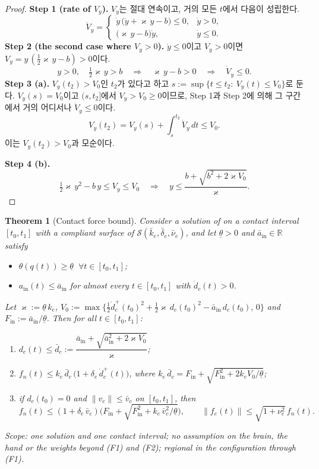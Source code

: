 \documentclass[11pt]{article}\usepackage[margin=1in]{geometry}\usepackage{amsmath,amssymb,amsthm,mathtools}\usepackage{graphicx}\graphicspath{{figures/}{../figures/}{figs/}{./}}\usepackage{enumitem}\usepackage{hyperref}\usepackage{cleveref}\usepackage{tikz}\usetikzlibrary{arrows.meta,positioning,calc,shapes.geometric}\usepackage{float}\usepackage{rotating}\usepackage[most]{tcolorbox}\usepackage{kotex}\usepackage{booktabs}\usepackage{longtable}\emergencystretch=1.6em\tolerance=2000 \crefname{assumption}{Assumption}{Assumptions}\Crefname{assumption}{Assumption}{Assumptions}\crefname{definition}{Definition}{Definitions}\Crefname{definition}{Definition}{Definitions}\crefname{proposition}{Proposition}{Propositions}\Crefname{proposition}{Proposition}{Propositions}\crefname{fact}{Fact}{Facts}\Crefname{fact}{Fact}{Facts} \newtheorem{assumption}{Assumption}\newtheorem{definition}{Definition}\newtheorem{lemma}{Lemma}\newtheorem{proposition}{Proposition}\newtheorem{theorem}{Theorem}\newtheorem{corollary}{Corollary}\newtheorem{fact}{Fact}\theoremstyle{remark}\newtheorem{remark}{Remark} \newcommand{\R}{\mathbb{R}}\newcommand{\xb}{\bar x}\newcommand{\Ab}{\bar A}\newcommand{\By}{\bar B_y}\newcommand{\U}{\mathcal U}\newcommand{\Z}{\mathcal Z}
\begin{document}
\begin{proof}
\textbf{Step 1 (rate of $V_y$).} $V_y$는 절대 연속이고, 거의 모든 $t$에서 다음이 성립한다.
\[
\dot V_y=\begin{cases}\dot y\,\big(\ddot y+\varkappa\,y-b\big)\le0, & \dot y>0,\\[2pt] \big(\varkappa\,y-b\big)\dot y, & \dot y\le0.\end{cases}
\]
\textbf{Step 2 (the second case where $V_y>0$).} $\dot y\le0$이고 $V_y>0$이면 $V_y=y\,(\tfrac12\varkappa\,y-b)>0$이다.
\[
y>0,\quad \tfrac12\varkappa\,y>b\quad\Longrightarrow\quad \varkappa\,y-b>0\quad\Longrightarrow\quad \dot V_y\le0 .
\]
\textbf{Step 3 (a).} $V_y(t_2)>V_0$인 $t_2$가 있다고 하고 $s:=\sup\{t\le t_2:\ V_y(t)\le V_0\}$로 둔다. $V_y(s)=V_0$이고 $(s,t_2]$에서 $V_y>V_0\ge0$이므로, Step 1과 Step 2에 의해 그 구간에서 거의 어디서나 $\dot V_y\le0$이다.
\[
V_y(t_2)=V_y(s)+\int_s^{t_2}\dot V_y\,dt\le V_0 .
\]
이는 $V_y(t_2)>V_0$과 모순이다.

\textbf{Step 4 (b).}
\[
\tfrac12\varkappa\,y^2-b\,y\le V_y\le V_0\quad\Longrightarrow\quad y\le\frac{b+\sqrt{b^2+2\varkappa V_0}}{\varkappa} .
\]
\end{proof}

\begin{theorem}[Contact force bound]
\label{thm:force}
Consider a solution of  on a contact interval $[t_0,t_1]$ with a compliant surface of $\mathcal S(\bar k_e,\bar\delta_e,\bar\nu_e)$, and let $\underline\theta>0$ and $\bar a_{\mathrm{in}}\in\R$ satisfy
\begin{itemize}
\item[\textbf{(F1)}] $\theta(q(t))\ge\underline\theta$ $\ \forall t\in[t_0,t_1]$;
\item[\textbf{(F2)}] $a_{\mathrm{in}}(t)\le\bar a_{\mathrm{in}}$ for almost every $t\in[t_0,t_1]$ with $\dot d_c(t)>0$.
\end{itemize}
Let $\varkappa:=\underline\theta\,k_e$, $V_0:=\max\{\tfrac12\dot d_c^+(t_0)^2+\tfrac12\varkappa\,d_c(t_0)^2-\bar a_{\mathrm{in}}\,d_c(t_0),\,0\}$ and $F_{\mathrm{in}}:=\bar a_{\mathrm{in}}/\underline\theta$. Then for all $t\in[t_0,t_1]$:
\begin{enumerate}[label=(\alph*)]
\item $d_c(t)\le\bar d_c:=\dfrac{\bar a_{\mathrm{in}}+\sqrt{\bar a_{\mathrm{in}}^2+2\varkappa V_0}}{\varkappa}$;
\item $f_n(t)\le k_e\,\bar d_c\,\big(1+\delta_e\,\dot d_c^+(t)\big)$, where $k_e\,\bar d_c=F_{\mathrm{in}}+\sqrt{F_{\mathrm{in}}^2+2k_eV_0/\underline\theta}$;
\item if $d_c(t_0)=0$ and $\|v_c\|\le\bar v_c$ on $[t_0,t_1]$, then
\[
f_n(t)\le(1+\delta_e\,\bar v_c)\Big(F_{\mathrm{in}}+\sqrt{F_{\mathrm{in}}^2+k_e\,\bar v_c^2/\underline\theta}\Big),\qquad \|f_e(t)\|\le\sqrt{1+\nu_e^2}\,f_n(t) .
\]
\end{enumerate}
Scope: one solution and one contact interval; no assumption on the brain, the hand or the weights beyond (F1) and (F2); regional in the configuration through (F1).
\end{theorem}
\end{document}

